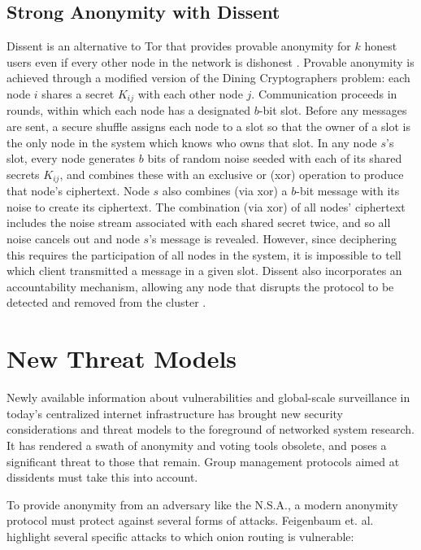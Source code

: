   \subsection{Strong Anonymity with Dissent}
    Dissent is an alternative to Tor that provides provable anonymity for $k$
    honest users even if every other node in the network is dishonest
    \cite{p2pd}.  Provable anonymity is achieved through a modified version of
    the Dining Cryptographers problem\cite{chaum_dining_1988}: each node $i$
    shares a secret $K_{ij}$ with each other node $j$. Communication proceeds in
    rounds, within which each node has a designated $b$-bit slot.  Before any
    messages are sent, a secure shuffle\cite{neff} assigns each node to a slot
    so that the owner of a slot is the only node in the system which knows who
    owns that slot.  In any node $s$'s slot, every node generates $b$ bits of
    random noise seeded with each of its shared secrets $K_{ij}$, and combines
    these with an exclusive or (xor) operation to produce that node's
    ciphertext. Node $s$ also combines (via xor) a $b$-bit message with its
    noise to create its ciphertext. The combination (via xor) of all nodes'
    ciphertext includes the noise stream associated with each shared secret
    twice, and so all noise cancels out and node $s$'s message is revealed.
    However, since deciphering this requires the participation of all nodes in
    the system, it is impossible to tell which client transmitted a message in a
    given slot. Dissent also incorporates an accountability mechanism, allowing
    any node that disrupts the protocol to be detected and removed from the
    cluster \cite{verdict}.

\section{New Threat Models}
Newly available information about vulnerabilities and global-scale
surveillance in today's centralized internet infrastructure has brought new
security considerations and threat models to the foreground of networked
system research. It has rendered a swath of anonymity and voting tools
obsolete, and poses a significant threat to those that remain. Group
management protocols aimed at dissidents must take this into account.

To provide anonymity from an adversary like the N.S.A., a modern anonymity
protocol must protect against several forms of attacks. Feigenbaum et.
al.\cite{feigenbaum_seeking_2013} highlight several specific attacks to
which onion routing is vulnerable:
